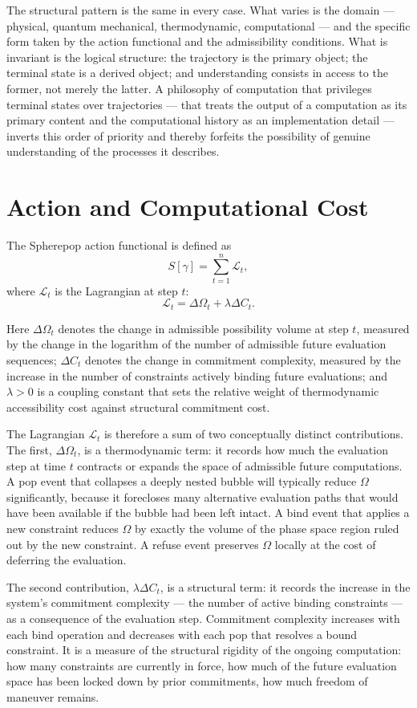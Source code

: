 \documentclass[12pt,openany]{book}
\theoremstyle{plain}
\theoremstyle{definition}
\theoremstyle{remark}
\begin{document}
The structural pattern is the same in every case. What varies is the domain — physical, quantum mechanical, thermodynamic, computational — and the specific form taken by the action functional and the admissibility conditions. What is invariant is the logical structure: the trajectory is the primary object; the terminal state is a derived object; and understanding consists in access to the former, not merely the latter. A philosophy of computation that privileges terminal states over trajectories — that treats the output of a computation as its primary content and the computational history as an implementation detail — inverts this order of priority and thereby forfeits the possibility of genuine understanding of the processes it describes.

\section{Action and Computational Cost}

The Spherepop action functional is defined as
\[
  S[\gamma] = \sum_{t=1}^{n} \mathcal{L}_t,
\]
where $\mathcal{L}_t$ is the Lagrangian at step $t$:
\[
  \mathcal{L}_t = \Delta\Omega_t + \lambda \Delta C_t.
\]

Here $\Delta\Omega_t$ denotes the change in admissible possibility volume at step $t$, measured by the change in the logarithm of the number of admissible future evaluation sequences; $\Delta C_t$ denotes the change in commitment complexity, measured by the increase in the number of constraints actively binding future evaluations; and $\lambda > 0$ is a coupling constant that sets the relative weight of thermodynamic accessibility cost against structural commitment cost.

The Lagrangian $\mathcal{L}_t$ is therefore a sum of two conceptually distinct contributions. The first, $\Delta\Omega_t$, is a thermodynamic term: it records how much the evaluation step at time $t$ contracts or expands the space of admissible future computations. A pop event that collapses a deeply nested bubble will typically reduce $\Omega$ significantly, because it forecloses many alternative evaluation paths that would have been available if the bubble had been left intact. A bind event that applies a new constraint reduces $\Omega$ by exactly the volume of the phase space region ruled out by the new constraint. A refuse event preserves $\Omega$ locally at the cost of deferring the evaluation.

The second contribution, $\lambda \Delta C_t$, is a structural term: it records the increase in the system's commitment complexity — the number of active binding constraints — as a consequence of the evaluation step. Commitment complexity increases with each bind operation and decreases with each pop that resolves a bound constraint. It is a measure of the structural rigidity of the ongoing computation: how many constraints are currently in force, how much of the future evaluation space has been locked down by prior commitments, how much freedom of maneuver remains.
\end{document}
